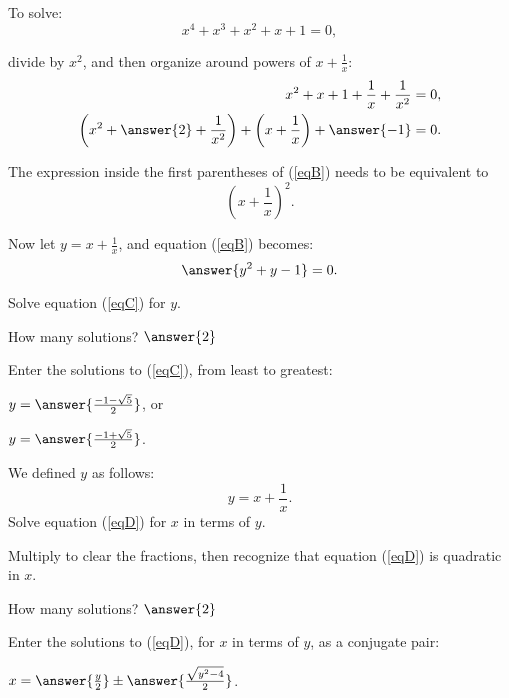 \documentclass[space,nooutcomes]{ximera}
\begin{document}
\begin{problem}

To solve: 
\begin{equation}
x^4+x^3+x^2+x+1=0,
\end{equation}

divide by $x^2$, and then organize around powers of $x + \frac{1}{x}$: 
\begin{align}
x^2+x+1+\frac{1}{x}+\frac{1}{x^2}&=0, \\
\left(x^2+ \answer{2} + \frac{1}{x^2}\right)+ \left(x+\frac{1}{x}\right)+\answer{-1}&=0. \label{eqB}
\end{align}
\begin{hint}
The expression inside the first parentheses of (\ref{eqB}) needs to be equivalent to 
\[
\left(x+\frac{1}{x}\right)^2.
\]
\end{hint}
\begin{problem}
Now let $y = x + \frac{1}{x}$, and equation (\ref{eqB}) becomes: 
\begin{equation} \label{eqC}
\answer{y^2+y-1}=0.
\end{equation}

Solve equation (\ref{eqC}) for $y$.

How many solutions?  $\answer{2}$ 

\begin{problem}
Enter the solutions to (\ref{eqC}), from least to greatest: 

\begin{prompt}
$y = \answer{\frac{-1-\sqrt{5}}{2}}$, or 

$y = \answer{\frac{-1+\sqrt{5}}{2}}$.
\end{prompt}

\end{problem}
\end{problem}
\end{problem}

\begin{problem}
We defined $y$ as follows: 
\begin{equation} \label{eqD}
y = x + \frac{1}{x}.  
\end{equation}
Solve equation (\ref{eqD}) for $x$ in terms of $y$.  
\begin{hint}
Multiply to clear the fractions, then recognize that equation (\ref{eqD}) is quadratic in $x$.  
\end{hint}

How many solutions?  $\answer{2}$ 
\begin{problem}
\begin{prompt}
Enter the solutions to (\ref{eqD}), for $x$ in terms of $y$, as a conjugate pair: 

$x = \answer{\frac{y}{2}} \pm \answer{\frac{\sqrt{y^2-4}}{2}}$.

\end{prompt}

\end{problem}
\end{problem}
\end{document}
